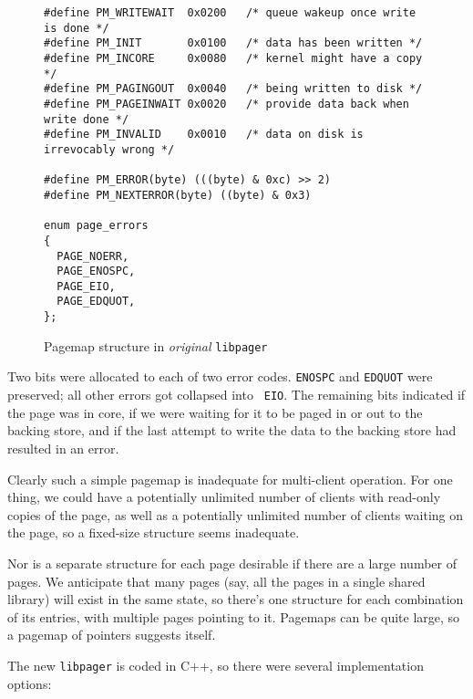 \documentclass{article}
\def\libpager{{\tt libpager}\xspace}
\begin{document}
\begin{figure}[h]
\begin{mdframed}[backgroundcolor=lightblue]
\begin{verbatim}
#define PM_WRITEWAIT  0x0200   /* queue wakeup once write is done */
#define PM_INIT       0x0100   /* data has been written */
#define PM_INCORE     0x0080   /* kernel might have a copy */
#define PM_PAGINGOUT  0x0040   /* being written to disk */
#define PM_PAGEINWAIT 0x0020   /* provide data back when write done */
#define PM_INVALID    0x0010   /* data on disk is irrevocably wrong */

#define PM_ERROR(byte) (((byte) & 0xc) >> 2)
#define PM_NEXTERROR(byte) ((byte) & 0x3)

enum page_errors
{
  PAGE_NOERR,
  PAGE_ENOSPC,
  PAGE_EIO,
  PAGE_EDQUOT,
};
\end{verbatim}
\end{mdframed}
\caption{Pagemap structure in {\it original} {\tt libpager}}
\end{figure}

Two bits were allocated to each of two error codes.  {\tt ENOSPC} and
{\tt EDQUOT} were preserved; all other errors got collapsed into {\tt
  EIO}.  The remaining bits indicated if the page was in core, if we
were waiting for it to be paged in or out to the backing store, and if
the last attempt to write the data to the backing store had resulted
in an error.

Clearly such a simple pagemap is inadequate for multi-client
operation.  For one thing, we could have a potentially unlimited
number of clients with read-only copies of the page, as well as a
potentially unlimited number of clients waiting on the page, so
a fixed-size structure seems inadequate.

Nor is a separate structure for each page desirable if there are a
large number of pages.  We anticipate that many pages (say, all the
pages in a single shared library) will exist in the same state, so
there's one structure for each combination of its entries, with
multiple pages pointing to it.  Pagemaps can be quite large, so a
pagemap of pointers suggests itself.

The new \libpager is coded in C++, so there were several implementation options:
\end{document}
